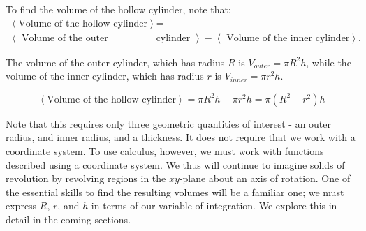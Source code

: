 \documentclass{ximera}
\begin{document}
\begin{image} %
\end{image}

To find the volume of the hollow cylinder, note that:
\begin{align*}
\left< \textrm{Volume of the hollow cylinder} \right>  &=   \\
 \left< \textrm{ Volume of the outer} \right. & \left. \textrm{cylinder } \right> - \left< \textrm{ Volume of the inner cylinder} \right>.
\end{align*}
 
 The volume of the outer cylinder, which has radius $R$ is $V_{outer} = \pi R^2 h$, while the volume of the inner cylinder, which has radius $r$ is $V_{inner} = \pi r^2 h$.  
 
\[
\left< \textrm{Volume of the hollow cylinder} \right> = \pi R^2h-\pi r^2h=\pi(R^2-r^2)h 
\]

Note that this requires only three geometric quantities of interest - an outer radius, and inner radius, and a thickness.  It does not require that we work with a coordinate system.  To use calculus, however, we must work with functions described using a coordinate system.  We thus will continue to imagine solids of revolution by revolving regions in the $xy$-plane about an axis of rotation.  One of the essential skills to find the resulting volumes will be a familiar one; we must express $R$, $r$, and $h$ in terms of our variable of integration.  We explore this in detail in the coming sections.
\end{document}
